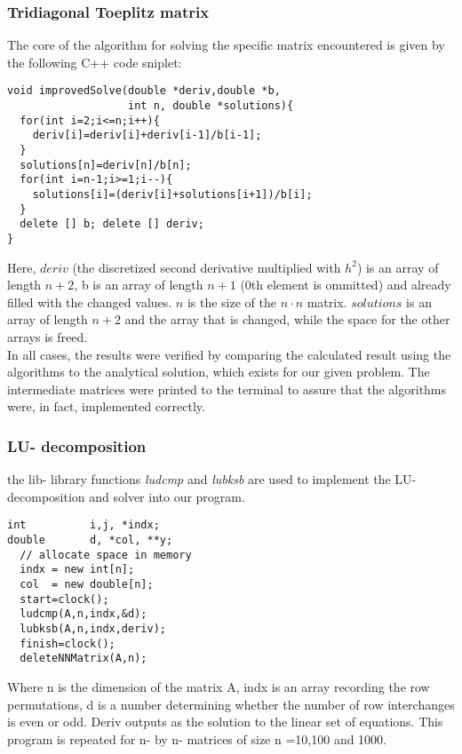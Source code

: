 \documentclass[10pt,a4paper]{article}
\begin{document}
\subsubsection{Tridiagonal Toeplitz matrix}
The core of the algorithm for solving the specific matrix encountered is given by the following C++ code sniplet:
\begin{lstlisting}[caption=Code for solving the specific triangular matrix]
void improvedSolve(double *deriv,double *b,
				   int n, double *solutions){
  for(int i=2;i<=n;i++){
    deriv[i]=deriv[i]+deriv[i-1]/b[i-1];
  }
  solutions[n]=deriv[n]/b[n];
  for(int i=n-1;i>=1;i--){
    solutions[i]=(deriv[i]+solutions[i+1])/b[i];
  }
  delete [] b; delete [] deriv;
}
\end{lstlisting}
Here, $deriv$ (the discretized second derivative multiplied with $h^2$) is an array of length $n+2$, b is an array of length $n+1$ (0th element is ommitted) and already filled with the changed values.  $n$ is the size of the $n\cdot n$ matrix. $solutions$ is an array of length $n+2$ and the array that is changed, while the space for the other arrays is freed.\\
In all cases, the results were verified by comparing the calculated result using the algorithms to the analytical solution, which exists for our given problem. The intermediate matrices were printed to the terminal to assure that the algorithms were, in fact, implemented correctly. 
\subsubsection{LU- decomposition}

the lib- library functions \emph{ludcmp} and  \emph{lubksb} are used to implement the LU- decomposition and solver into our program.
\begin{lstlisting}[caption=Calling the inbuilt lib.cpp functions "ludcmp" and "lubksb" on the matrix A]
int          i,j, *indx;
double       d, *col, **y;
  // allocate space in memory
  indx = new int[n];
  col  = new double[n];
  start=clock();
  ludcmp(A,n,indx,&d);
  lubksb(A,n,indx,deriv);
  finish=clock();
  deleteNNMatrix(A,n);
\end{lstlisting}
Where n is the dimension of the matrix A, indx is an array recording the row permutations, d is a number determining whether the number of row interchanges is even or odd. Deriv outputs as the solution to the linear set of equations. This program is repeated for n- by n- matrices of size n =10,100 and 1000.
\end{document}
